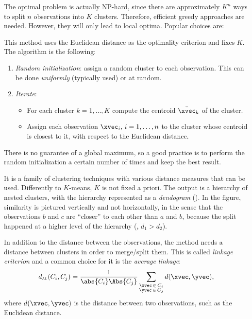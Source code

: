 The optimal problem is actually NP-hard, since there are approximately $K^n$ ways to split $n$ observations into $K$ clusters. Therefore, efficient greedy approaches are needed. However, they will only lead to local optima. Popular choices are:
\begin{description}[beginpenalty=10000]
    \item[$K$\negthinspace-means] This method uses the Euclidean distance as the optimality criterion and fixes $K$. The algorithm is the following:
          \begin{enumerate}[beginpenalty=10000]
              \item \emph{Random initialization}: assign a random cluster to each observation. This can be done \emph{uniformly} (typically used) or at random.
              \item \emph{Iterate}:
                    \begin{itemize}
                        \item For each cluster $k = 1, \ldots, K$ compute the centroid $\bar{\xvec}_k$ of the cluster.
                        \item Assign each observation $\xvec_i,\,i = 1, \ldots, n$ to the cluster whose centroid is closest to it, with respect to the Euclidean distance.
                    \end{itemize}
          \end{enumerate}

          There is no guarantee of a global maximum, so a good practice is to perform the random initialization a certain number of times and keep the best result.
    \item[Hierarchical clustering] It is a family of clustering techniques with various distance measures that can be used. Differently to $K$\negthinspace-means, $K$ is not fixed a priori. The output is a hierarchy of nested clusters, with the hierarchy represented as a \emph{dendogram} (). In the figure, similarity is pictured vertically and not horizontally, in the sense that the observations $b$ and $c$ are ``closer'' to each other than $a$ and $b$, because the split happened at a higher level of the hierarchy (\ie, $d_1 > d_2$).

          In addition to the distance between the observations, the method needs a distance between clusters in order to merge/split them. This is called \emph{linkage criterion} and a common choice for it is the \emph{average linkage}:
          \begin{equation}
              d_{\textsc{al}}(C_i, C_j) = \frac{1}{\abs{C_i}\Abs{C_j}} \sum_{\substack{\xvec\,\in\,C_i\\\yvec\,\in\,C_j}} d(\xvec, \yvec),
          \end{equation}
          where $d(\xvec, \yvec)$ is the distance between two observations, such as the Euclidean distance.


\end{description}
